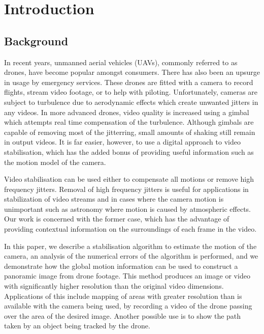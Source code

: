 \section{Introduction}
\subsection{Background}
In recent years, unmanned aerial vehicles (UAVs),
commonly referred to as drones,
have become popular amongst consumers.
There has also been an upsurge in usage by emergency services.
These drones are fitted with a camera to record flights, stream video footage, or to help  with piloting.
Unfortunately, cameras are subject to turbulence due to aerodynamic effects which create unwanted jitters in any videos. 
In more advanced drones, video quality is increased using a gimbal which attempts real time compensation of the turbulence.
Although gimbals are capable of removing most of the jitterring, small amounts of shaking still remain in output videos.
It is far easier, however, to use a digital approach to video stabilisation, which has the added bonus of providing useful information such as the motion model of the camera.

Video stabilisation can be used either to compensate all motions or remove high frequency jitters.
Removal of high frequency jitters is useful for applications in stabilization of video streams and in cases
where the camera motion is unimportant such as astronomy where motion is caused by atmospheric effects\cite{Lou2013}. 
Our work is concerned with the former case, which has the advantage of providing contextual information on the surroundings of each frame in the video\cite{Kumar2001}.  


In this paper, we describe a stabilisation algorithm to estimate the motion of the camera,
an analysis of the numerical errors of the algorithm is performed,
and we demonstrate how the global motion information can be used to construct a panoramic image from drone footage.
This method produces an image or video with significantly higher resolution than the original video dimensions. 
Applications of this include mapping of areas with greater resolution than is available with the camera being used, by recording a video of the drone passing over the area of the desired image.
Another possible use is to show the path taken by an object being tracked by the drone.

